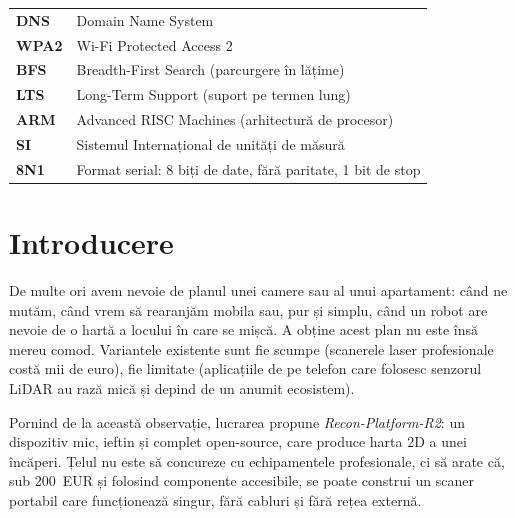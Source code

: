 \documentclass[a4paper,12pt,twoside,openany]{report}
\begin{document}
\begin{longtable}{@{}>{\bfseries}p{2.8cm} p{\dimexpr\textwidth-3.2cm\relax}@{}}
DNS       & Domain Name System \\
WPA2      & Wi-Fi Protected Access 2 \\
BFS       & Breadth-First Search (parcurgere în lățime) \\
LTS       & Long-Term Support (suport pe termen lung) \\
ARM       & Advanced RISC Machines (arhitectură de procesor) \\
SI        & Sistemul Internațional de unități de măsură \\
8N1       & Format serial: 8 biți de date, fără paritate, 1 bit de stop \\
\end{longtable}
\clearpage

\thispagestyle{coperta}
\listoffigures
\clearpage

\thispagestyle{coperta}
\listoftables
\clearpage

\pagestyle{fancy}
\makeatletter
\let\ps@plain\ps@fancy
\makeatother

\chapter{Introducere}
\label{cap:introducere}

De multe ori avem nevoie de planul unei camere sau al unui apartament: când
ne mutăm, când vrem să rearanjăm mobila sau, pur și simplu, când un robot are
nevoie de o hartă a locului în care se mișcă. A obține acest plan nu este însă
mereu comod. Variantele existente sunt fie scumpe (scanerele laser
profesionale costă mii de euro), fie limitate (aplicațiile de pe telefon care
folosesc senzorul LiDAR au rază mică și depind de un anumit ecosistem).

Pornind de la această observație, lucrarea propune \textit{Recon-Platform-R2}:
un dispozitiv mic, ieftin și complet open-source, care produce harta 2D a unei
încăperi. Țelul nu este să concureze cu echipamentele profesionale, ci să arate
că, sub 200~EUR și folosind componente accesibile, se poate construi un scaner
portabil care funcționează singur, fără cabluri și fără rețea externă.
\end{document}
